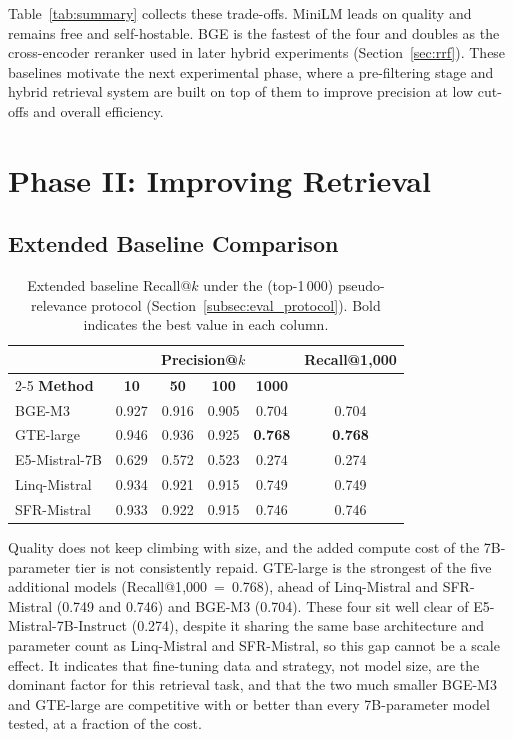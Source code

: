 \documentclass[a4paper,oneside,bibliography=totoc]{scrbook}
\begin{document}
Table~\ref{tab:summary} collects these trade-offs. MiniLM leads on quality and remains free and self-hostable. BGE is the fastest of the four and doubles as the cross-encoder reranker used in later hybrid experiments (Section~\ref{sec:rrf}). These baselines motivate the next experimental phase, where a pre-filtering stage and hybrid retrieval system are built on top of them to improve precision at low cut-offs and overall efficiency.

\section{Phase II: Improving Retrieval}
\label{sec:phase2_result}

\subsection{Extended Baseline Comparison}
\label{sec:extended_baselines_result}

\begin{table}[ht]
\centering
\caption{Extended baseline Recall@$k$ under the (top-1\,000)
         pseudo-relevance protocol (Section~\ref{subsec:eval_protocol}).
         Bold indicates the best value in each column.}
\label{tab:extended_baselines}
\begin{tabular}{lccccc}
\toprule
& \multicolumn{4}{c}{\textbf{Precision@$k$}} & \textbf{Recall@1{,}000} \\
\cmidrule(lr){2-5}
\textbf{Method} & \textbf{10} & \textbf{50} & \textbf{100} & \textbf{1000} & \\
\midrule
BGE-M3        & 0.927 & 0.916 & 0.905 & 0.704          & 0.704 \\
GTE-large     & 0.946 & 0.936 & 0.925 & \textbf{0.768} & \textbf{0.768} \\
E5-Mistral-7B & 0.629 & 0.572 & 0.523 & 0.274          & 0.274 \\
Linq-Mistral  & 0.934 & 0.921 & 0.915 & 0.749          & 0.749 \\
SFR-Mistral   & 0.933 & 0.922 & 0.915 & 0.746          & 0.746 \\
\bottomrule
\end{tabular}
\end{table}

Quality does not keep climbing with size, and the added compute cost of the 7B-parameter tier is not consistently repaid. GTE-large is the strongest of the five additional models (Recall@1{,}000~=~0.768), ahead of Linq-Mistral and SFR-Mistral (0.749 and 0.746) and BGE-M3 (0.704). These four sit well clear of E5-Mistral-7B-Instruct (0.274), despite it sharing the same base architecture and parameter count as Linq-Mistral and SFR-Mistral, so this gap cannot be a scale effect. It indicates that fine-tuning data and strategy, not model size, are the dominant factor for this retrieval task, and that the two much smaller BGE-M3 and GTE-large are competitive with or better than every 7B-parameter model tested, at a fraction of the cost. 
\end{document}
